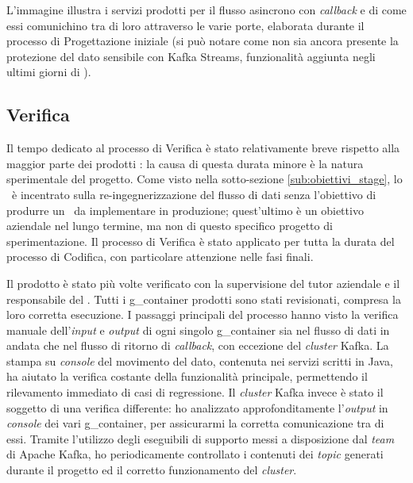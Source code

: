 L'immagine illustra i servizi prodotti per il flusso asincrono con \textit{callback} e di come essi comunichino tra di loro attraverso le varie porte, elaborata durante il processo di Progettazione iniziale (si può notare come non sia ancora presente la protezione del dato sensibile con Kafka Streams, funzionalità aggiunta negli ultimi giorni di \stage).


\subsection{Verifica}


Il tempo dedicato al processo di Verifica è stato relativamente breve rispetto alla maggior parte dei prodotti \software: la causa di questa durata minore è la natura sperimentale del progetto.
Come visto nella sotto-sezione \ref{sub:obiettivi_stage}, lo \stage\ è incentrato sulla re-ingegnerizzazione del flusso di dati senza l'obiettivo di produrre un \middleware\ da implementare in produzione; quest'ultimo è un obiettivo aziendale nel lungo termine, ma non di questo specifico progetto di sperimentazione.
Il processo di Verifica è stato applicato per tutta la durata del processo di Codifica, con particolare attenzione nelle fasi finali.

Il prodotto è stato più volte verificato con la supervisione del tutor aziendale e il responsabile del .
Tutti i \gls{g_container} prodotti sono stati revisionati, compresa la loro corretta esecuzione.
I passaggi principali del processo hanno visto la verifica manuale dell'\textit{input} e \textit{output} di ogni singolo \gls{g_container} sia nel flusso di dati in andata che nel flusso di ritorno di \textit{callback}, con eccezione del \textit{cluster} Kafka.
La stampa su \textit{console} del movimento del dato, contenuta nei servizi scritti in Java, ha aiutato la verifica costante della funzionalità principale, permettendo il rilevamento immediato di casi di regressione.
Il \textit{cluster} Kafka invece è stato il soggetto di una verifica differente: ho analizzato approfonditamente l'\textit{output} in \textit{console} dei vari \gls{g_container}, per assicurarmi la corretta comunicazione tra di essi.
Tramite l'utilizzo degli eseguibili di supporto messi a disposizione dal \textit{team} di Apache Kafka, ho periodicamente controllato i contenuti dei \textit{topic} generati durante il progetto ed il corretto funzionamento del \textit{cluster}.


